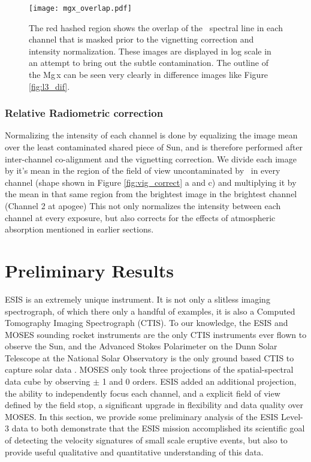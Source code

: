         
  
        
        \begin{figure}[htb!]
        	\centering
        	\texttt{[image: mgx\_overlap.pdf]}
        	\caption{The red hashed region shows the overlap of the \mgxbright \ spectral line in each channel that is masked prior to the vignetting correction and intensity normalization. These images are displayed in log scale in an attempt to bring out the subtle contamination.  The outline of the Mg\,{\sc x} can be seen very clearly in difference images like Figure \ref{fig:l3_dif}. }

        	\label{fig:mgx_overlap}
        \end{figure}
        
        

        
    \subsubsection{Relative Radiometric correction }
        
        Normalizing the intensity of each channel is done by equalizing the image mean over the least contaminated shared piece of Sun, and is therefore performed after inter-channel co-alignment and the vignetting correction.
        We divide each image by it's mean in the region of the field of view uncontaminated by \mgxbright \ in every channel (shape shown in Figure \ref{fig:vig_correct} a and c) and multiplying it by the mean in that same region from the brightest image in the brightest channel (Channel 2 at apogee)
        This not only normalizes the intensity between each channel at every exposure, but also corrects for the effects of atmospheric absorption mentioned in earlier sections. 


\section{Preliminary Results}

	   ESIS is an extremely unique instrument.  It is not only a slitless imaging spectrograph, of which there only a handful of examples, it is also a Computed Tomography Imaging Spectrograph (CTIS).  
	   To our knowledge, the ESIS and MOSES sounding rocket instruments are the only CTIS instruments ever flown to observe the Sun, and  the Advanced Stokes Polarimeter on the Dunn Solar Telescope at the National Solar Observatory is the only ground based CTIS to capture solar data \citep{deforest2004}.  
	   MOSES only took three projections of the spatial-spectral data cube by observing $\pm$ 1 and 0 orders.
	   ESIS added an additional projection, the ability to independently focus each channel, and a explicit field of view defined by the field stop, a significant upgrade in flexibility and data quality over MOSES.
	   In this section, we provide some preliminary analysis of the ESIS Level-3 data to both demonstrate that the ESIS mission accomplished its scientific goal of detecting the velocity signatures of small scale eruptive events, but also to provide useful qualitative and quantitative understanding of this data.  
		
